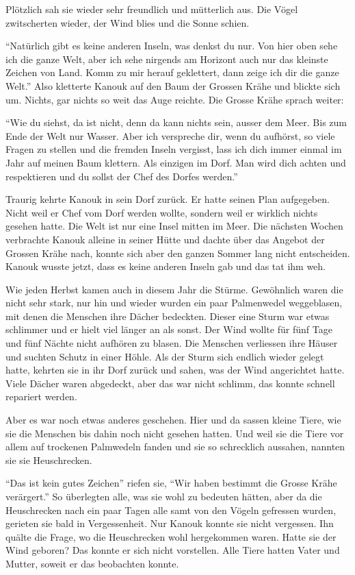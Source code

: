 Plötzlich sah sie wieder sehr freundlich und mütterlich aus. Die Vögel zwitscherten wieder, der Wind blies und die Sonne schien.

\enquote{Natürlich gibt es keine anderen Inseln, was denkst du nur. Von hier oben sehe ich die ganze Welt, aber ich sehe nirgends am Horizont auch nur das kleinste Zeichen von Land. Komm zu mir herauf geklettert, dann zeige ich dir die ganze Welt.} Also kletterte Kanouk auf den Baum der Grossen Krähe und blickte sich um. Nichts, gar nichts so weit das Auge reichte. Die Grosse Krähe sprach weiter:

\enquote{Wie du siehst, da ist nicht, denn da kann nichts sein, ausser dem Meer. Bis zum Ende der Welt nur Wasser. Aber ich verspreche dir, wenn du aufhörst, so viele Fragen zu stellen und die fremden Inseln vergisst, lass ich dich immer einmal im Jahr auf meinen Baum klettern. Als einzigen im Dorf. Man wird dich achten und respektieren und du sollst der Chef des Dorfes werden.}

Traurig kehrte Kanouk in sein Dorf zurück. Er hatte seinen Plan aufgegeben. Nicht weil er Chef vom Dorf werden wollte, sondern weil er wirklich nichts gesehen hatte. Die Welt ist nur eine Insel mitten im Meer. Die nächsten Wochen verbrachte Kanouk alleine in seiner Hütte und dachte über das Angebot der Grossen Krähe nach, konnte sich aber den ganzen Sommer lang nicht entscheiden. Kanouk wusste jetzt, dass es keine anderen Inseln gab und das tat ihm weh.

Wie jeden Herbst kamen auch in diesem Jahr die Stürme. Gewöhnlich waren die nicht sehr stark, nur hin und wieder wurden ein paar Palmenwedel weggeblasen, mit denen die Menschen ihre Dächer bedeckten. Dieser eine Sturm war etwas schlimmer und er hielt viel länger an als sonst. Der Wind wollte für fünf Tage und fünf Nächte nicht aufhören zu blasen. Die Menschen verliessen ihre Häuser und suchten Schutz in einer Höhle. Als der Sturm sich endlich wieder gelegt hatte, kehrten sie in ihr Dorf zurück und sahen, was der Wind angerichtet hatte. Viele Dächer waren abgedeckt, aber das war nicht schlimm, das konnte schnell repariert werden. 

Aber es war noch etwas anderes geschehen. Hier und da sassen kleine Tiere, wie sie die Menschen bis dahin noch nicht gesehen hatten. Und weil sie die Tiere vor allem auf trockenen Palmwedeln fanden und sie so schrecklich aussahen, nannten sie sie Heuschrecken. 

\enquote{Das ist kein gutes Zeichen} riefen sie, \enquote{Wir haben bestimmt die Grosse Krähe verärgert.} So überlegten alle, was sie wohl zu bedeuten hätten, aber da die Heuschrecken nach ein paar Tagen alle samt von den Vögeln gefressen wurden, gerieten sie bald in Vergessenheit. Nur Kanouk konnte sie nicht vergessen. Ihn quälte die Frage, wo die Heuschrecken wohl hergekommen waren. Hatte sie der Wind geboren? Das konnte er sich nicht vorstellen. Alle Tiere hatten Vater und Mutter, soweit er das beobachten konnte. 

